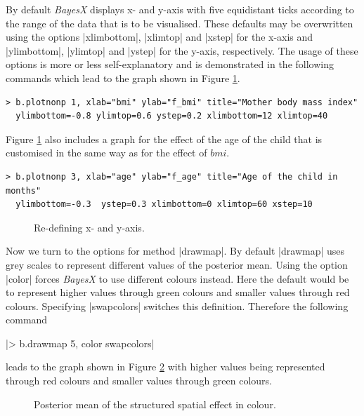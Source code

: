 \documentclass[a4paper]{article}
\begin{document}
By default {\it BayesX} displays x- and y-axis with five equidistant ticks according to the range of the data that is to be
visualised. These defaults may be overwritten using the options |xlimbottom|, |xlimtop| and |xstep| for the x-axis and
|ylimbottom|, |ylimtop| and |ystep| for the y-axis, respectively. The usage of these options is more or less self-explanatory
and is demonstrated in the following commands which lead to the graph shown in Figure \ref{bmi6}.

\begin{verbatim}
> b.plotnonp 1, xlab="bmi" ylab="f_bmi" title="Mother body mass index"
  ylimbottom=-0.8 ylimtop=0.6 ystep=0.2 xlimbottom=12 xlimtop=40
\end{verbatim}

Figure \ref{bmi6} also includes a graph for the effect of the age
of the child that is customised in the same way as for the effect
of $bmi$.

\begin{verbatim}
> b.plotnonp 3, xlab="age" ylab="f_age" title="Age of the child in months"
  ylimbottom=-0.3  ystep=0.3 xlimbottom=0 xlimtop=60 xstep=10
\end{verbatim}

\begin{figure}[ht]
\begin{center}
{\it\caption{Re-defining x- and y-axis.\label{bmi6}}}
\end{center}
\end{figure}

Now we turn to the options for method |drawmap|. By default |drawmap| uses grey scales to represent different values of the
posterior mean. Using the option |color| forces {\it BayesX} to use different colours instead. Here the default would be to
represent higher values through green colours and smaller values through red colours. Specifying |swapcolors| switches this
definition. Therefore the following command

|> b.drawmap 5, color swapcolors|

leads to the graph shown in Figure \ref{spat3} with higher values
being represented through red colours and smaller values through
green colours.

\begin{figure}[ht]
\begin{center}
{\it\caption{Posterior mean of the structured spatial effect in
colour.\label{spat3}}}
\end{center}
\end{figure}
\end{document}
